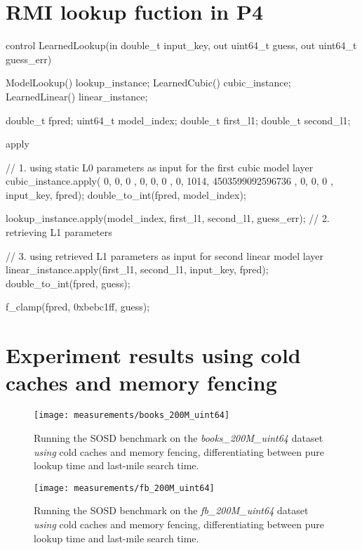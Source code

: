 \section{RMI lookup fuction in P4}

\begin{P4}
control LearnedLookup(in double_t input_key, out uint64_t guess, out uint64_t guess_err) {
  ModelLookup() lookup_instance;
  LearnedCubic() cubic_instance;
  LearnedLinear() linear_instance;

  double_t fpred;
  uint64_t model_index;
  double_t first_l1; double_t second_l1;

  apply {
    // 1. using static L0 parameters as input for the first cubic model layer
    cubic_instance.apply({ 0, 0, 0 }, { 0, 0, 0 }, { 0, 1014, 4503599092596736 }, { 0, 0, 0 }, input_key, fpred);
    double_to_int(fpred, model_index);

    lookup_instance.apply(model_index, first_l1, second_l1, guess_err); // 2. retrieving L1 parameters

    // 3. using retrieved L1 parameters as input for second linear model layer
    linear_instance.apply(first_l1, second_l1, input_key, fpred);
    double_to_int(fpred, guess);

    f_clamp(fpred, 0xbebc1ff, guess);
  }
}\end{P4}

\newpage %

\section{Experiment results using cold caches and memory fencing}
\label{sect:appendix:measurements}

\captionsetup[figure]{skip=10pt} %
\begin{figure}[!htb]
  \centering
  \texttt{[image: measurements/books\_200M\_uint64]}
  \caption*{
    Running the SOSD benchmark on the \emph{books\_200M\_uint64} dataset \emph{using} cold caches and memory fencing, differentiating between pure lookup time and last-mile search time.
  }
\end{figure}

\begin{figure}[!htb]
  \centering
  \texttt{[image: measurements/fb\_200M\_uint64]}
  \caption*{
    Running the SOSD benchmark on the \emph{fb\_200M\_uint64} dataset \emph{using} cold caches and memory fencing, differentiating between pure lookup time and last-mile search time.
  }
\end{figure}


